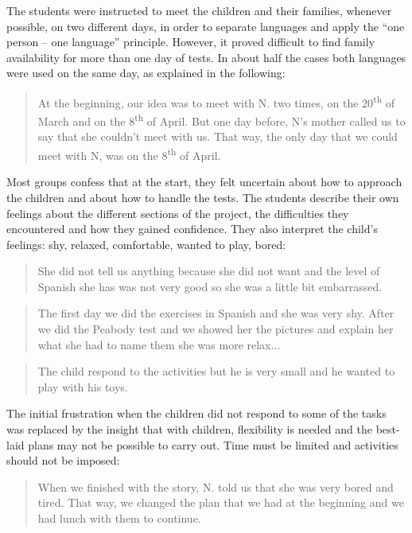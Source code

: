 \documentclass[output=paper]{../langscibook}
\begin{document}
The students were instructed to meet the children and their families, whenever possible, on two different days, in order to separate languages and apply the “one person – one language” principle. However, it proved difficult to find family availability for more than one day of tests. In about half the cases both languages were used on the same day, as explained in the following:

\begin{quote}
At the beginning, our idea was to meet with N. two times, on the 20\textsuperscript{th} of March and on the 8\textsuperscript{th} of April. But one day before, N’s mother called us to say that she couldn’t meet with us. That way, the only day that we could meet with N, was on the 8\textsuperscript{th} of April.
\end{quote}

Most groups confess that at the start, they felt uncertain about how to approach the children and about how to handle the tests. The students describe their own feelings about the different sections of the project, the difficulties they encountered and how they gained confidence. They also interpret the child’s feelings: shy, relaxed, comfortable, wanted to play, bored:

\begin{quote}
She did not tell us anything because she did not want and the level of Spanish she has was not very good so she was a little bit embarrassed.
\end{quote}

\begin{quote}
The first day we did the exercises in Spanish and she was very shy. After we did the Peabody test and we showed her the pictures and explain her what she had to name them she was more relax... 
\end{quote}

\begin{quote}
The child respond to the activities but he is very small and he wanted to play with his toys.
\end{quote}

The initial frustration when the children did not respond to some of the tasks was replaced by the insight that with children, flexibility is needed and the best-laid plans may not be possible to carry out. Time must be limited and activities should not be imposed:

\begin{quote}
When we finished with the story, N. told us that she was very bored and tired. That way, we changed the plan that we had at the beginning and we had lunch with them to continue.
\end{quote}
\end{document}
